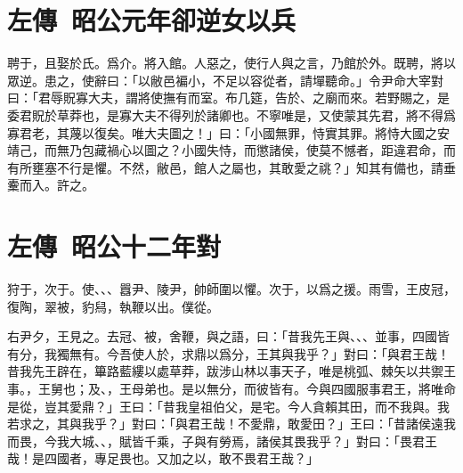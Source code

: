 \section[子產卻楚逆女以兵\quad{\small 左傳 昭公元年}]{{\normalsize 左傳\ 昭公元年}\quad {}卻逆女以兵}
聘于，且娶於氏。爲介。將入館。人惡之，使行人與之言，乃館於外。既聘，將以眾逆。患之，使辭曰：「以敝邑褊小，不足以容從者，請墠聽命。」令尹命{大}宰對曰：「君辱貺寡大夫，謂將使撫有而室。布几筵，告於、之廟而來。若野賜之，是委君貺於草莽也，是寡大夫不得列於諸卿也。不寧唯是，又使蒙其先君，將不得爲寡君老，其蔑以復矣。唯大夫圖之！」曰：「小國無罪，恃實其罪。將恃大國之安靖己，而無乃包藏禍心以圖之？小國失恃，而懲諸侯，使莫不憾者，距違君命，而有所壅塞不行是懼。不然，敝邑，館人之屬也，其敢愛之祧？」知其有備也，請垂櫜而入。許之。

\section[子革對靈王\quad{\small 左傳 昭公十二年}]{{\normalsize 左傳\ 昭公十二年}\quad {}對}
狩于，次于。使、、、囂尹、陵尹，帥師圍以懼。次于，以爲之援。雨雪，王皮冠，復陶，翠被，豹舄，執鞭以出。僕從。

右尹夕，王見之。去冠、被，舍鞭，與之語，曰：「昔我先王與、、、並事，四國皆有分，我獨無有。今吾使人於，求鼎以爲分，王其與我乎？」對曰：「與君王哉！昔我先王辟在，篳路藍縷以處草莽，跋涉山林以事天子，唯是桃弧、棘矢以共禦王事。，王舅也；及、，王母弟也。是以無分，而彼皆有。今與四國服事君王，將唯命是從，豈其愛鼎？」王曰：「昔我皇祖伯父，是宅。今人貪賴其田，而不我與。我若求之，其與我乎？」對曰：「與君王哉！不愛鼎，敢愛田？」王曰：「昔諸侯遠我而畏，今我大城、、，賦皆千乘，子與有勞焉，諸侯其畏我乎？」對曰：「畏君王哉！是四國者，專足畏也。又加之以，敢不畏君王哉？」

